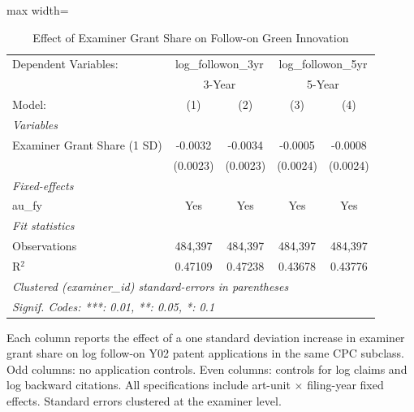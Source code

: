 
\begin{table}[htbp]
   \caption{\label{tab:main} Effect of Examiner Grant Share on Follow-on Green Innovation}
   \centering
   \begin{adjustbox}{max width=\textwidth}
   \begin{tabular}{lcccc}
      \tabularnewline \midrule \midrule
      Dependent Variables: & \multicolumn{2}{c}{log\_followon\_3yr} & \multicolumn{2}{c}{log\_followon\_5yr}\\
       & \multicolumn{2}{c}{3-Year} & \multicolumn{2}{c}{5-Year} \\
      Model:                   & (1)      & (2)      & (3)      & (4)\\
      \midrule
      \emph{Variables}\\
      Examiner Grant Share (1 SD) & -0.0032  & -0.0034  & -0.0005  & -0.0008\\
                               & (0.0023) & (0.0023) & (0.0024) & (0.0024)\\
      \midrule
      \emph{Fixed-effects}\\
      au\_fy                   & Yes      & Yes      & Yes      & Yes\\
      \midrule
      \emph{Fit statistics}\\
      Observations             & 484,397  & 484,397  & 484,397  & 484,397\\
      R$^2$                    & 0.47109  & 0.47238  & 0.43678  & 0.43776\\
      \midrule \midrule
      \multicolumn{5}{l}{\emph{Clustered (examiner\_id) standard-errors in parentheses}}\\
      \multicolumn{5}{l}{\emph{Signif. Codes: ***: 0.01, **: 0.05, *: 0.1}}\\
   \end{tabular}
   \end{adjustbox}

   \par \raggedright
   Each column reports the effect of a one standard deviation increase in examiner grant share on log follow-on Y02 patent applications in the same CPC subclass. Odd columns: no application controls. Even columns: controls for log claims and log backward citations. All specifications include art-unit $\times$ filing-year fixed effects. Standard errors clustered at the examiner level.
\end{table}

